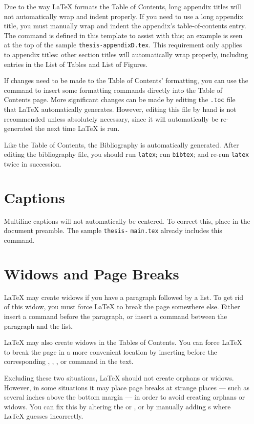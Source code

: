 Due to the way \LaTeX{} formats the Table of Contents, long appendix titles
will not automatically wrap and indent properly.  If you need to use a long
appendix title, you must manually wrap and indent the appendix's
table-of-contents entry.  The  command is defined in this
template to assist with this; an example is seen at the top of the sample
\texttt{thesis-appendixD.tex}.  This requirement only applies to appendix
titles: other section titles will automatically wrap properly, including
entries in the List of Tables and List of Figures.

If changes need to be made to the Table of Contents' formatting, you can use
the  command to insert some formatting commands
directly into the Table of Contents page.  More significant changes can be made
by editing the \texttt{.toc} file that \LaTeX{} automatically generates.
However, editing this file by hand is not recommended unless absolutely
necessary, since it will automatically be re-generated the next time \LaTeX{}
is run.

Like the Table of Contents, the Bibliography is automatically generated.  After
editing the bibliography file, you should run \texttt{latex}; run
\texttt{bibtex}; and re-run \texttt{latex} twice in succession.

\section{Captions}

\sloppypar
Multiline captions will not automatically be centered.  To correct this, place
 in the document preamble.  The sample
\texttt{thesis-} \texttt{main.tex} already includes this command.

\section{Widows and Page Breaks}

\LaTeX{} may create widows if you have a paragraph followed by a list.  To get
rid of this widow, you must force \LaTeX{} to break the page somewhere else.
Either insert a  command before the paragraph, or insert a
 command between the paragraph and the list.

\LaTeX{} may also create widows in the Tables of Contents.  You can force
\LaTeX{} to break the page in a more convenient location by inserting
 before the corresponding
, , , or  command
in the text.

Excluding these two situations, \LaTeX{} should not create orphans or widows.
However, in some situations it may place page breaks at strange places --- such
as several inches above the bottom margin --- in order to avoid creating
orphans or widows.  You can fix this by altering the  or
, or by manually adding s where \LaTeX{} guesses
incorrectly.

